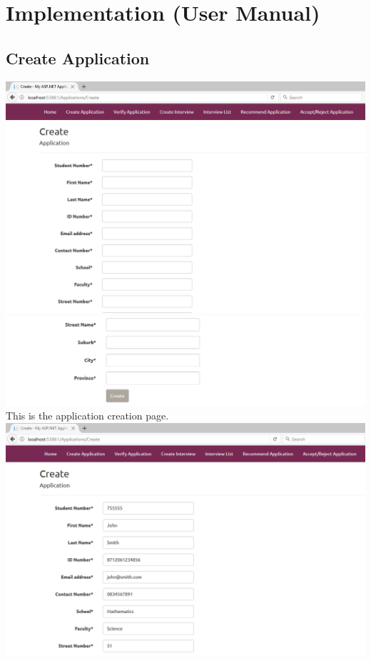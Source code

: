 \documentclass{article}
\begin{document}
\section{Implementation (User Manual)}
\subsection{Create Application}
\begin{center}
\includegraphics[scale=0.5]{CreateApplication.png}\\
\includegraphics[scale=0.5]{CreateApplication2.png}\\
This is the application creation page.\\ \bigskip
\includegraphics[scale=0.5]{CreateApplication3.png}\\

\end{center}
\end{document}
